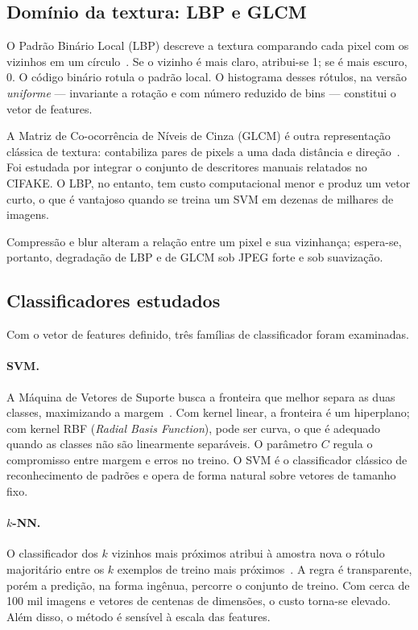 \documentclass[12pt]{article}
\begin{document}
\subsection{Domínio da textura: LBP e GLCM}

O Padrão Binário Local (LBP) descreve a textura comparando cada pixel com os vizinhos em um círculo~\cite{ojala2002lbp}. Se o vizinho é mais claro, atribui-se 1; se é mais escuro, 0. O código binário rotula o padrão local. O histograma desses rótulos, na versão \emph{uniforme} --- invariante a rotação e com número reduzido de bins --- constitui o vetor de features.

A Matriz de Co-ocorrência de Níveis de Cinza (GLCM) é outra representação clássica de textura: contabiliza pares de pixels a uma dada distância e direção~\cite{gonzalez2018,nirob2026handcrafted}. Foi estudada por integrar o conjunto de descritores manuais relatados no CIFAKE. O LBP, no entanto, tem custo computacional menor e produz um vetor curto, o que é vantajoso quando se treina um SVM em dezenas de milhares de imagens.

Compressão e blur alteram a relação entre um pixel e sua vizinhança; espera-se, portanto, degradação de LBP e de GLCM sob JPEG forte e sob suavização.

\subsection{Classificadores estudados}

Com o vetor de features definido, três famílias de classificador foram examinadas.

\paragraph{SVM.}
A Máquina de Vetores de Suporte busca a fronteira que melhor separa as duas classes, maximizando a margem~\cite{cortes1995svm}. Com kernel linear, a fronteira é um hiperplano; com kernel RBF (\emph{Radial Basis Function}), pode ser curva, o que é adequado quando as classes não são linearmente separáveis. O parâmetro $C$ regula o compromisso entre margem e erros no treino. O SVM é o classificador clássico de reconhecimento de padrões e opera de forma natural sobre vetores de tamanho fixo.

\paragraph{$k$-NN.}
O classificador dos $k$ vizinhos mais próximos atribui à amostra nova o rótulo majoritário entre os $k$ exemplos de treino mais próximos~\cite{cover1967knn}. A regra é transparente, porém a predição, na forma ingênua, percorre o conjunto de treino. Com cerca de 100 mil imagens e vetores de centenas de dimensões, o custo torna-se elevado. Além disso, o método é sensível à escala das features.
\end{document}
